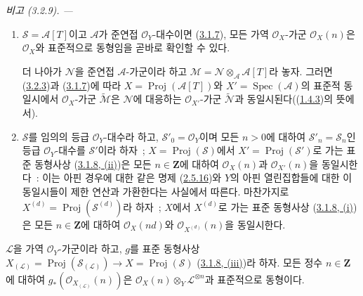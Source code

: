 \par\medskip\noindent\textit{비고 (3.2.9). ---\ }
\label{II.3.2.9-ko}
\begin{enumerate}
  \item[\rm(i)] $\mathcal{S}=\mathcal{A}[T]$이고 $\mathcal{A}$가 준연접
    $\mathcal{O}_Y$-대수이면
    (\hyperref[II.3.1.7-ko]{3.1.7}), 모든 가역
    $\mathcal{O}_X$-가군 $\mathcal{O}_X(n)$은 $\mathcal{O}_X$와
    표준적으로 동형임을 곧바로 확인할 수 있다.

    더 나아가 $\mathcal{N}$을 준연접 $\mathcal{A}$-가군이라 하고
    $\mathcal{M}=\mathcal{N}\otimes_{\mathcal{A}}\mathcal{A}[T]$라 놓자.
    그러면 (\hyperref[II.3.2.3-ko]{3.2.3})과
    (\hyperref[II.3.1.7-ko]{3.1.7})에 따라
    $X=\operatorname{Proj}(\mathcal{A}[T])$와
    $X'=\operatorname{Spec}(\mathcal{A})$의 표준적 동일시에서
    $\mathcal{O}_X$-가군 $\widetilde{\mathcal{M}}$은 $\mathcal{N}$에
    대응하는 $\mathcal{O}_{X'}$-가군 $\widetilde{\mathcal{N}}$과
    동일시된다((\hyperref[II.1.4.3-ko]{1.4.3})의 뜻에서).
  \item[\rm(ii)] $\mathcal{S}$를 임의의 등급 $\mathcal{O}_Y$-대수라 하고,
    $\mathcal{S}'_0=\mathcal{O}_Y$이며 모든 $n>0$에 대하여
    $\mathcal{S}'_n=\mathcal{S}_n$인 등급 $\mathcal{O}_Y$-대수를
    $\mathcal{S}'$이라 하자~; $X=\operatorname{Proj}(\mathcal{S})$에서
    $X'=\operatorname{Proj}(\mathcal{S}')$로 가는 표준 동형사상
    (\hyperref[II.3.1.8-ko]{3.1.8, (ii)})은 모든 $n\in\mathbf{Z}$에 대하여
    $\mathcal{O}_X(n)$과 $\mathcal{O}_{X'}(n)$을 동일시한다~: 이는 아핀
    경우에 대한 같은 명제 (\hyperref[II.2.5.16-ko]{2.5.16})와 $Y$의 아핀
    열린집합들에 대한 이 동일시들이 제한 연산과 가환한다는 사실에서 따른다.
    마찬가지로 $X^{(d)}=\operatorname{Proj}(\mathcal{S}^{(d)})$라 하자~;
    $X$에서 $X^{(d)}$로 가는 표준 동형사상
    (\hyperref[II.3.1.8-ko]{3.1.8, (i)})은 모든 $n\in\mathbf{Z}$에 대하여
    $\mathcal{O}_X(nd)$와 $\mathcal{O}_{X^{(d)}}(n)$을 동일시한다.
\end{enumerate}

\begin{proposition}[3.2.10]
\label{II.3.2.10-ko}
$\mathcal{L}$을 가역 $\mathcal{O}_Y$-가군이라 하고, $g$를 표준 동형사상
$X_{(\mathcal{L})}=\operatorname{Proj}(\mathcal{S}_{(\mathcal{L})})
\to X=\operatorname{Proj}(\mathcal{S})$
(\hyperref[II.3.1.8-ko]{3.1.8, (iii)})라 하자. 모든 정수
$n\in\mathbf{Z}$에 대하여
$g_*(\mathcal{O}_{X_{(\mathcal{L})}}(n))$은
$\mathcal{O}_X(n)\otimes_Y\mathcal{L}^{\otimes n}$과 표준적으로 동형이다.
\end{proposition}

